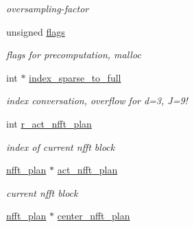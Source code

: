 \begin{CompactItemize}
\begin{CompactList}\small\item\em oversampling-factor \item\end{CompactList}\item 
\hypertarget{structnsfft__plan_5fcea2cbb16bfdfc4a5a3f5142db3281}{
unsigned \hyperlink{structnsfft__plan_5fcea2cbb16bfdfc4a5a3f5142db3281}{flags}}
\label{structnsfft__plan_5fcea2cbb16bfdfc4a5a3f5142db3281}

\begin{CompactList}\small\item\em flags for precomputation, malloc \item\end{CompactList}\item 
\hypertarget{structnsfft__plan_9112356adf28d6c7f6c5d57354b8fa55}{
int $\ast$ \hyperlink{structnsfft__plan_9112356adf28d6c7f6c5d57354b8fa55}{index\_\-sparse\_\-to\_\-full}}
\label{structnsfft__plan_9112356adf28d6c7f6c5d57354b8fa55}

\begin{CompactList}\small\item\em index conversation, overflow for d=3, J=9! \item\end{CompactList}\item 
\hypertarget{structnsfft__plan_0a1b5e59c9ff83bc7b2d2894f96edd23}{
int \hyperlink{structnsfft__plan_0a1b5e59c9ff83bc7b2d2894f96edd23}{r\_\-act\_\-nfft\_\-plan}}
\label{structnsfft__plan_0a1b5e59c9ff83bc7b2d2894f96edd23}

\begin{CompactList}\small\item\em index of current nfft block \item\end{CompactList}\item 
\hypertarget{structnsfft__plan_9a3f23953542f9909597f559a546422f}{
\hyperlink{structnfft__plan}{nfft\_\-plan} $\ast$ \hyperlink{structnsfft__plan_9a3f23953542f9909597f559a546422f}{act\_\-nfft\_\-plan}}
\label{structnsfft__plan_9a3f23953542f9909597f559a546422f}

\begin{CompactList}\small\item\em current nfft block \item\end{CompactList}\item 
\hypertarget{structnsfft__plan_0d68f66b8d41342a0b6e820ee2fffb3e}{
\hyperlink{structnfft__plan}{nfft\_\-plan} $\ast$ \hyperlink{structnsfft__plan_0d68f66b8d41342a0b6e820ee2fffb3e}{center\_\-nfft\_\-plan}}
\label{structnsfft__plan_0d68f66b8d41342a0b6e820ee2fffb3e}


\end{CompactItemize}
